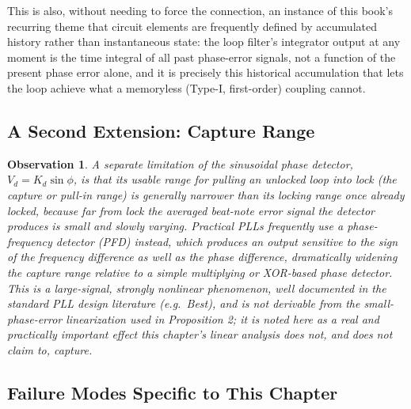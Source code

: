 \documentclass[12pt]{article}
\newtheorem{observation}{Observation}
\begin{document}
This is also, without needing to force the connection, an instance of this book's recurring theme that circuit elements are frequently defined by accumulated history rather than instantaneous state: the loop filter's integrator output at any moment is the time integral of all past phase-error signals, not a function of the present phase error alone, and it is precisely this historical accumulation that lets the loop achieve what a memoryless (Type-I, first-order) coupling cannot.

\subsection{A Second Extension: Capture Range}

\begin{observation}
A separate limitation of the sinusoidal phase detector, $V_d = K_d\sin\phi$, is that its usable range for pulling an unlocked loop into lock (the capture or pull-in range) is generally narrower than its locking range once already locked, because far from lock the averaged beat-note error signal the detector produces is small and slowly varying. Practical PLLs frequently use a phase-frequency detector (PFD) instead, which produces an output sensitive to the sign of the frequency difference as well as the phase difference, dramatically widening the capture range relative to a simple multiplying or XOR-based phase detector. This is a large-signal, strongly nonlinear phenomenon, well documented in the standard PLL design literature (e.g.\ Best), and is not derivable from the small-phase-error linearization used in Proposition 2; it is noted here as a real and practically important effect this chapter's linear analysis does not, and does not claim to, capture.
\end{observation}

\subsection{Failure Modes Specific to This Chapter}
\end{document}
